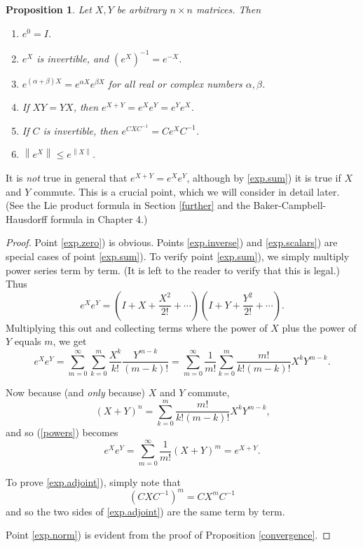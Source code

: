\documentclass[12pt]{amsbook}
\theoremstyle{plain}
\newtheorem{proposition}[theorem]{Proposition}
\numberwithin{equation}{chapter}
\numberwithin{theorem}{chapter}
\begin{document}
\begin{proposition}
\label{exp.properties}Let $X,Y$ be arbitrary $n\times n$ matrices. Then

\begin{enumerate}
\item \label{exp.zero}$e^{0}=I$.

\item \label{exp.inverse}$e^{X}$ is invertible, and $\left(  e^{X}\right)
^{-1}=e^{-X}$.

\item \label{exp.scalars}$e^{(\alpha+\beta)X}=e^{\alpha X}e^{\beta X}$ for all
real or complex numbers $\alpha,\beta$.

\item \label{exp.sum}If $XY=YX$, then $e^{X+Y}=e^{X}e^{Y}=e^{Y}e^{X}$.

\item \label{exp.adjoint}If $C$ is invertible, then $e^{CXC^{-1}}=Ce^{X}%
C^{-1}$.

\item \label{exp.norm}$\left\|  e^{X}\right\|  \leq e^{\left\|  X\right\|  }$.
\end{enumerate}
\end{proposition}

It is \textit{not} true in general that $e^{X+Y}=e^{X}e^{Y}$, although by
\ref{exp.sum}) it is true if $X$ and $Y$ commute. This is a crucial point,
which we will consider in detail later. (See the Lie product formula in
Section \ref{further} and the Baker-Campbell-Hausdorff formula in Chapter 4.)

\begin{proof}
Point \ref{exp.zero}) is obvious. Points \ref{exp.inverse}) and
\ref{exp.scalars}) are special cases of point \ref{exp.sum}). To verify point
\ref{exp.sum}), we simply multiply power series term by term. (It is left to
the reader to verify that this is legal.) Thus
\[
e^{X}e^{Y}=\left(  I+X+\frac{X^{2}}{2!}+\cdots\right)  \left(  I+Y+\frac
{Y^{2}}{2!}+\cdots\right)  \text{.}%
\]
Multiplying this out and collecting terms where the power of $X$ plus the
power of $Y$ equals $m$, we get
\begin{equation}
e^{X}e^{Y}=\sum_{m=0}^{\infty}\sum_{k=0}^{m}\frac{X^{k}}{k!}\frac{Y^{m-k}%
}{(m-k)!}=\sum_{m=0}^{\infty}\frac{1}{m!}\sum_{k=0}^{m}\frac{m!}%
{k!(m-k)!}X^{k}Y^{m-k}\text{.}\label{powers}%
\end{equation}

Now because (and \textit{only} because) $X$ and $Y$ commute,
\[
(X+Y)^{n}=\sum_{k=0}^{m}\frac{m!}{k!(m-k)!}X^{k}Y^{m-k}\text{,}%
\]
and so (\ref{powers}) becomes
\[
e^{X}e^{Y}=\sum_{m=0}^{\infty}\frac{1}{m!}(X+Y)^{m}=e^{X+Y}\text{.}%
\]

To prove \ref{exp.adjoint}), simply note that
\[
\left(  CXC^{-1}\right)  ^{m}=CX^{m}C^{-1}%
\]
and so the two sides of \ref{exp.adjoint}) are the same term by term.

Point \ref{exp.norm}) is evident from the proof of Proposition
\ref{convergence}.
\end{proof}
\end{document}
